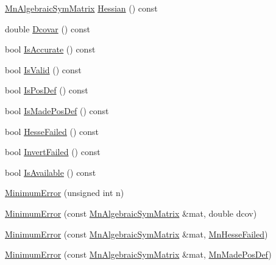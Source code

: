 \begin{DoxyCompactItemize}
\item 
\mbox{\hyperlink{namespaceROOT_1_1Minuit2_a9e74ad97f5537a2e80e52b04d98ecc6e}{Mn\+Algebraic\+Sym\+Matrix}} \mbox{\hyperlink{classROOT_1_1Minuit2_1_1MinimumError_a7f591009a8e0d017a77da5efa5f6a7e0}{Hessian}} () const
\item 
double \mbox{\hyperlink{classROOT_1_1Minuit2_1_1MinimumError_acd4dec46c23542a2b79183a6d5fe6679}{Dcovar}} () const
\item 
bool \mbox{\hyperlink{classROOT_1_1Minuit2_1_1MinimumError_a70c9ff6b59f2c01e5e54b4010326753d}{Is\+Accurate}} () const
\item 
bool \mbox{\hyperlink{classROOT_1_1Minuit2_1_1MinimumError_a0e9a9c525f7ac2e5dc5c7973056a852b}{Is\+Valid}} () const
\item 
bool \mbox{\hyperlink{classROOT_1_1Minuit2_1_1MinimumError_afffbed3fdd6785c959ca619a59aaaf74}{Is\+Pos\+Def}} () const
\item 
bool \mbox{\hyperlink{classROOT_1_1Minuit2_1_1MinimumError_addbc60edad85c271c20be5ff18678599}{Is\+Made\+Pos\+Def}} () const
\item 
bool \mbox{\hyperlink{classROOT_1_1Minuit2_1_1MinimumError_adf8acb6ea4137162b034eb6b9a79d9b9}{Hesse\+Failed}} () const
\item 
bool \mbox{\hyperlink{classROOT_1_1Minuit2_1_1MinimumError_ae9f212180703d5504c281f90efee263a}{Invert\+Failed}} () const
\item 
bool \mbox{\hyperlink{classROOT_1_1Minuit2_1_1MinimumError_af03638c23ec7b5573c139810cdb640c0}{Is\+Available}} () const
\item 
\mbox{\hyperlink{classROOT_1_1Minuit2_1_1MinimumError_a4438a39dcecf1990ed8449d1bad58116}{Minimum\+Error}} (unsigned int n)
\item 
\mbox{\hyperlink{classROOT_1_1Minuit2_1_1MinimumError_ac124d3ba147dbb6ed30ec4ca75afe5b4}{Minimum\+Error}} (const \mbox{\hyperlink{namespaceROOT_1_1Minuit2_a9e74ad97f5537a2e80e52b04d98ecc6e}{Mn\+Algebraic\+Sym\+Matrix}} \&mat, double dcov)
\item 
\mbox{\hyperlink{classROOT_1_1Minuit2_1_1MinimumError_a8b5e1aee505048147c296087ae9b2adb}{Minimum\+Error}} (const \mbox{\hyperlink{namespaceROOT_1_1Minuit2_a9e74ad97f5537a2e80e52b04d98ecc6e}{Mn\+Algebraic\+Sym\+Matrix}} \&mat, \mbox{\hyperlink{classROOT_1_1Minuit2_1_1MinimumError_1_1MnHesseFailed}{Mn\+Hesse\+Failed}})
\item 
\mbox{\hyperlink{classROOT_1_1Minuit2_1_1MinimumError_a40d062270456e450e1895179d99ee754}{Minimum\+Error}} (const \mbox{\hyperlink{namespaceROOT_1_1Minuit2_a9e74ad97f5537a2e80e52b04d98ecc6e}{Mn\+Algebraic\+Sym\+Matrix}} \&mat, \mbox{\hyperlink{classROOT_1_1Minuit2_1_1MinimumError_1_1MnMadePosDef}{Mn\+Made\+Pos\+Def}})

\end{DoxyCompactItemize}
